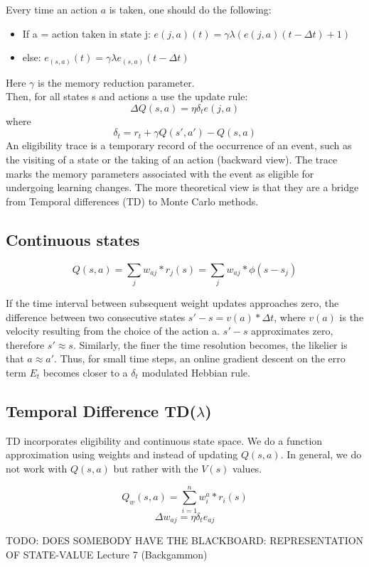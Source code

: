 \documentclass[11pt]{article}
\begin{document}
Every time an action $a$ is taken, one should do the following:
\begin{itemize}
	\item If a = action taken in state j: $e(j,a)(t) = \gamma\lambda\left( e(j,a)(t-\Delta t) + 1\right)$
	\item else: $e_(s,a)(t) = \gamma \lambda e_(s,a)(t-\Delta t)$ 
\end{itemize}
Here $\gamma$ is the memory reduction parameter.\\
Then, for all states s and actions a use the update rule:
\[
	\Delta Q(s,a) = \eta \delta_t e(j,a)
\]
where
\[
	\delta_t = r_{t}+\gamma Q(s',a')-Q(s,a)
\]
An eligibility trace is a temporary record of the occurrence of an event, such as the visiting of a state or the taking of an action (backward view). The trace marks the memory parameters associated with the event as eligible for undergoing learning changes. The more theoretical view is that they are a bridge from Temporal differences (TD) to Monte Carlo methods.

\subsection{Continuous states}
\[
	Q(s,a) = \sum_j w_{aj}*r_j(s) = \sum_j w_{aj}*\phi(s-s_j)
\]

If the time interval between subsequent weight updates approaches zero, the difference between two consecutive states $s' - s = v(a) * \Delta t$, where $v(a)$ is the velocity resulting from the choice of the action a. $s'-s$ approximates zero, therefore $s' \approx s$. Similarly, the finer the time resolution becomes, the likelier is that $a \approx a'$. Thus, for small time steps, an online gradient descent on the erro term $E_t$ becomes closer to a $\delta_t$ modulated Hebbian rule. 

\subsection{Temporal Difference TD($\lambda$)}
TD incorporates eligibility and continuous state space. We do a function approximation using weights and instead of updating $Q(s,a)$. In general, we do not work with $Q(s,a)$ but rather with the $V(s)$ values.

\[
	Q_w(s,a) = \sum_{i=1}^n w_i^a * r_i(s)
\]
\[
	\Delta w_{aj} = \eta \delta_t e_{aj}
\]

TODO: DOES SOMEBODY HAVE THE BLACKBOARD: REPRESENTATION OF STATE-VALUE Lecture 7 (Backgammon)
\end{document}
